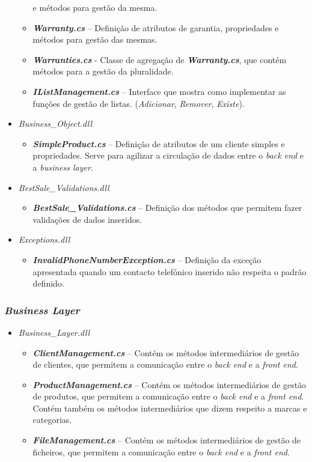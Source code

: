 \documentclass[11pt]{scrartcl} %
\begin{document}
\begin{itemize}
\begin{itemize}
			e métodos para gestão da mesma.
			\item
			\emph{\textbf{Warranty.cs}} -- Definição de atributos de garantia,
			propriedades e métodos para gestão das mesmas.
			\item
			\emph{\textbf{Warranties.cs}} - Classe de agregação de
			\emph{\textbf{Warranty.cs}}, que contém métodos para a gestão da
			pluralidade.
			\item
			\emph{\textbf{\textit{IListManagement.cs}}} -- Interface que mostra como implementar as funções de gestão de listas. (\textit{Adicionar}, \textit{Remover}, \textit{Existe}).
		\end{itemize}
		\item \textit{Business\_Object.dll}
		\begin{itemize}
			\item \emph{\textbf{SimpleProduct.cs}} -- Definição de atributos de um cliente simples e propriedades. Serve para agilizar a circulação de dados entre o \textit{back end} e a \textit{business layer}.
		\end{itemize}
		
		\item \textit{BestSale\_Validations.dll}
		\begin{itemize}
			\item \emph{\textbf{BestSale\_Validations.cs}} -- Definição dos métodos que permitem fazer validações de dados inseridos.
		\end{itemize}
		\item \textit{Exceptions.dll}
		\begin{itemize}
			\item \emph{\textbf{InvalidPhoneNumberException.cs}} -- Definição da exceção apresentada quando um contacto telefónico inserido não respeita o padrão definido.
		\end{itemize}
\end{itemize}

\subsubsection{\textit{Business Layer}}

\begin{itemize}
	\item \textit{Business\_Layer.dll}
	\begin{itemize}
		\item \emph{\textbf{ClientManagement.cs}} -- Contém os métodos intermediários de gestão de clientes, que permitem a comunicação entre o \textit{back end} e a \textit{front end}.
		\item \emph{\textbf{ProductManagement.cs}} -- Contém os métodos intermediários de gestão de produtos, que permitem a comunicação entre o \textit{back end} e a \textit{front end}. Contém também os métodos intermediários que dizem respeito a marcas e categorias.
		\item \emph{\textbf{FileManagement.cs}} -- Contém os métodos intermediários de gestão de ficheiros, que permitem a comunicação entre o \textit{back end} e a \textit{front end}.
	\end{itemize}
\end{itemize}
\end{document}
